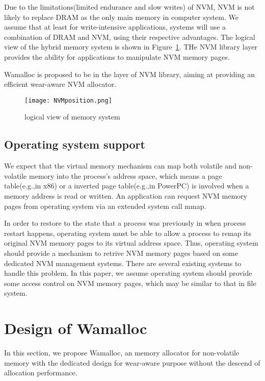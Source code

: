 \documentclass[10pt, conference, compsocconf]{IEEEtran}
\begin{document}
Due to the limitations(limited endurance and slow writes) of NVM,
NVM is not likely to replace DRAM as the only main memory in computer system.
We assume that at least for write-intensive applications,
systems will use a combination of DRAM and NVM, using their respective advantages.
The logical view of the hybrid memory system is shown in Figure~\ref{fig:NVMposition}.
THe NVM library layer provides the ability for applications to manipulate NVM memory pages.

Wamalloc is proposed to be in the layer of NVM library, aiming at providing an efficient wear-aware NVM allocator.

\begin{figure}[h]
\centering
\texttt{[image: NVMposition.png]}
\caption{logical view of memory system}
\label{fig:NVMposition}
\end{figure}

\subsection{Operating system support}

We expect that the virtual memory mechanism can map both volatile and non-volatile memory into the process's address space,
which means a page table(e.g.,in x86) or a inverted page table(e.g.,in PowerPC) is involved when a memory address is read or written.
An application can request NVM memory pages from operating system via an extended system call mmap.

In order to restore to the state that a process was previously in when process restart happens, 
operating system must be able to allow a process to remap its original NVM memory pages to its virtual address space.
Thus, operating system should provide a mechanism to retrive NVM memory pages based on some dedicated NVM management systems.
There are several existing systems to handle this problem\cite{coburn2011nv, satyanarayanan1994lightweight, volos2011mnemosyne}.
In this paper, we assume operating system should provide some access control on NVM memory pages, 
which may be similar to that in file system.

\section{Design of Wamalloc}

In this section, we propose Wamalloc, an memory allocator for non-volatile memory with the dedicated design for wear-aware purpose without the descend of allocation performance.
\end{document}
